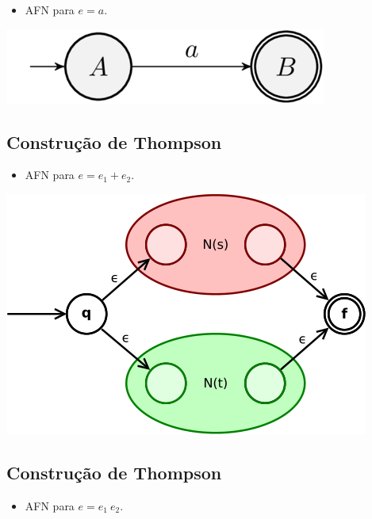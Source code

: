\documentclass[11pt]{article}
\begin{document}
\begin{itemize}
\item AFN para \(e = a\).
\end{itemize}

\begin{center}
\includegraphics[width=.9\linewidth]{./imgs/image3.png}
\end{center}
\subsection*{Construção de Thompson}
\label{sec:orgb545ffd}

\begin{itemize}
\item AFN para \(e = e_1 + e_2\).
\end{itemize}

\begin{center}
\includegraphics[width=.9\linewidth]{./imgs/image4.png}
\end{center}
\subsection*{Construção de Thompson}
\label{sec:orgb98a6a0}

\begin{itemize}
\item AFN para \(e = e_1\:e_2\).
\end{itemize}
\end{document}
